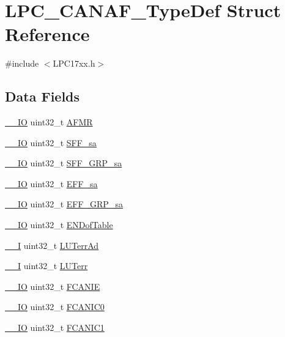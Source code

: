 \hypertarget{structLPC__CANAF__TypeDef}{}\section{L\+P\+C\+\_\+\+C\+A\+N\+A\+F\+\_\+\+Type\+Def Struct Reference}
\label{structLPC__CANAF__TypeDef}


{\ttfamily \#include $<$L\+P\+C17xx.\+h$>$}

\subsection*{Data Fields}
\begin{DoxyCompactItemize}
\item 
\hyperlink{LPC17xx_8h_aec43007d9998a0a0e01faede4133d6be}{\+\_\+\+\_\+\+IO} uint32\+\_\+t \hyperlink{structLPC__CANAF__TypeDef_a46504ef3dd5f85d3d2733af522b455bc}{A\+F\+MR}
\item 
\hyperlink{LPC17xx_8h_aec43007d9998a0a0e01faede4133d6be}{\+\_\+\+\_\+\+IO} uint32\+\_\+t \hyperlink{structLPC__CANAF__TypeDef_a55cb93958630b8b11dc10c682d7ede3a}{S\+F\+F\+\_\+sa}
\item 
\hyperlink{LPC17xx_8h_aec43007d9998a0a0e01faede4133d6be}{\+\_\+\+\_\+\+IO} uint32\+\_\+t \hyperlink{structLPC__CANAF__TypeDef_a372d5dfdf917983f56e4b337dba0cbba}{S\+F\+F\+\_\+\+G\+R\+P\+\_\+sa}
\item 
\hyperlink{LPC17xx_8h_aec43007d9998a0a0e01faede4133d6be}{\+\_\+\+\_\+\+IO} uint32\+\_\+t \hyperlink{structLPC__CANAF__TypeDef_a89c7026753c5e55a3e54a8382cd6a335}{E\+F\+F\+\_\+sa}
\item 
\hyperlink{LPC17xx_8h_aec43007d9998a0a0e01faede4133d6be}{\+\_\+\+\_\+\+IO} uint32\+\_\+t \hyperlink{structLPC__CANAF__TypeDef_a4d4dd49407ea55b29ba5ccc6b3601cdf}{E\+F\+F\+\_\+\+G\+R\+P\+\_\+sa}
\item 
\hyperlink{LPC17xx_8h_aec43007d9998a0a0e01faede4133d6be}{\+\_\+\+\_\+\+IO} uint32\+\_\+t \hyperlink{structLPC__CANAF__TypeDef_a705055dcc5dd3c2eaa964329bd2bcd7a}{E\+N\+Dof\+Table}
\item 
\hyperlink{LPC17xx_8h_af63697ed9952cc71e1225efe205f6cd3}{\+\_\+\+\_\+I} uint32\+\_\+t \hyperlink{structLPC__CANAF__TypeDef_adcb2a37f728f5c881aad68c9f390b82b}{L\+U\+Terr\+Ad}
\item 
\hyperlink{LPC17xx_8h_af63697ed9952cc71e1225efe205f6cd3}{\+\_\+\+\_\+I} uint32\+\_\+t \hyperlink{structLPC__CANAF__TypeDef_a3906d84d280b16221f3abfc14ec40bd7}{L\+U\+Terr}
\item 
\hyperlink{LPC17xx_8h_aec43007d9998a0a0e01faede4133d6be}{\+\_\+\+\_\+\+IO} uint32\+\_\+t \hyperlink{structLPC__CANAF__TypeDef_a6902f77f625316360c997fefac9aa1f8}{F\+C\+A\+N\+IE}
\item 
\hyperlink{LPC17xx_8h_aec43007d9998a0a0e01faede4133d6be}{\+\_\+\+\_\+\+IO} uint32\+\_\+t \hyperlink{structLPC__CANAF__TypeDef_a22606ef10c6771dd004b2a55664368cd}{F\+C\+A\+N\+I\+C0}
\item 
\hyperlink{LPC17xx_8h_aec43007d9998a0a0e01faede4133d6be}{\+\_\+\+\_\+\+IO} uint32\+\_\+t \hyperlink{structLPC__CANAF__TypeDef_ae2f12718ba3b2a51607b879f5f8c3806}{F\+C\+A\+N\+I\+C1}
\end{DoxyCompactItemize}


